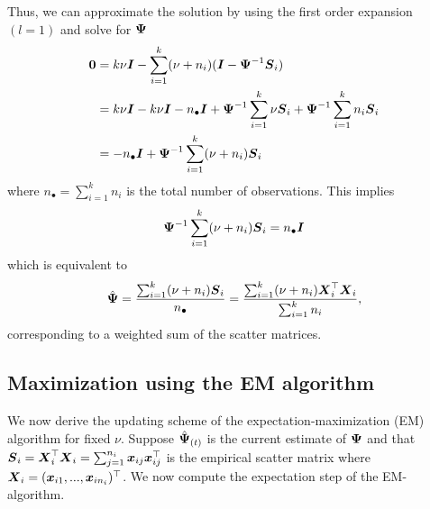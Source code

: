 \documentclass{article}\usepackage[]{graphicx}\usepackage[]{color}
\begin{document}
Thus, we can approximate the solution by using the first order expansion $(l = 1)$ and solve for ${\boldsymbol{\Psi}}$
\begin{align*}
  \boldsymbol{0}
  &= k\nu\boldsymbol{I} - \sum_{i=1}^k (\nu + n_i)(\boldsymbol{I} - {\boldsymbol{\Psi}}^{-1}\boldsymbol{S}_i) \\
  &= k\nu\boldsymbol{I}
   - k\nu\boldsymbol{I}
   - n_\bullet\boldsymbol{I}
   + {\boldsymbol{\Psi}}^{-1}\sum_{i=1}^k \nu\boldsymbol{S}_i
   + {\boldsymbol{\Psi}}^{-1}\sum_{i=1}^k n_i\boldsymbol{S}_i \\
  &= - n_\bullet\boldsymbol{I}
     + {\boldsymbol{\Psi}}^{-1}\sum_{i=1}^k (\nu + n_i) \boldsymbol{S}_i
\end{align*}
where $n_\bullet = \sum_{i=1}^k n_i$ is the total number of observations. This implies
\begin{align*}
   {\boldsymbol{\Psi}}^{-1}\sum_{i=1}^k (\nu + n_i) \boldsymbol{S}_i
    = n_\bullet \boldsymbol{I}
\end{align*}
which is equivalent to
\begin{align}
  \hat{{\boldsymbol{\Psi}}}
  = \frac{\sum_{i=1}^k (\nu + n_i) \boldsymbol{S}_i}{n_\bullet}
  = \frac{\sum_{i=1}^k (\nu + n_i){\boldsymbol{X}}_i^\top{\boldsymbol{X}}_i}{\sum_{i=1}^k n_i},
  \label{eq:mle}
\end{align}
corresponding to a weighted sum of the scatter matrices.




\subsection{Maximization using the EM algorithm}
We now derive the updating scheme of the expectation-maximization (EM) algorithm for fixed $\nu$.
Suppose ${\hat{\boldsymbol{\Psi}}}_{(t)}$ is the current estimate of ${\boldsymbol{\Psi}}$ and that ${\boldsymbol{S}}_i = {\boldsymbol{X}}_i^\top{\boldsymbol{X}}_i = \sum_{j = 1}^{n_i} {\boldsymbol{x}}_{ij} {\boldsymbol{x}}_{ij}^\top$ is the empirical scatter matrix where ${\boldsymbol{X}}_i = ({\boldsymbol{x}}_{i1}, ..., {\boldsymbol{x}}_{in_i})^\top$.
We now compute the expectation step of the EM-algorithm.
\end{document}
